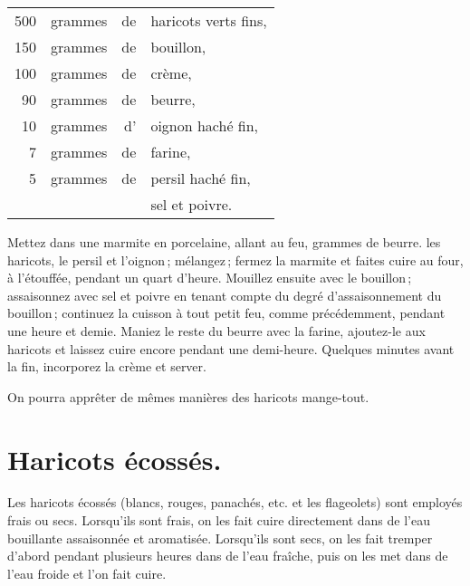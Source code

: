 \footnotesize
\begin{longtable}{rrrp{16em}}
    500 & grammes & de & haricots verts fins,                                                             \\
    150 & grammes & de & bouillon,                                                                        \\
    100 & grammes & de & crème,                                                                           \\
     90 & grammes & de & beurre,                                                                          \\
     10 & grammes & d' & oignon haché fin,                                                                \\
      7 & grammes & de & farine,                                                                          \\
      5 & grammes & de & persil haché fin,                                                                \\
        &         &    & sel et poivre.                                                                   \\
\end{longtable}
\normalsize

Mettez dans une marmite en porcelaine, allant au feu, {\mmm} grammes de
beurre. les haricots, le persil et l'oignon ; mélangez ; fermez la marmite et
faites cuire au four, à l'étouffée, pendant un quart d'heure. Mouillez ensuite
avec le bouillon ; assaisonnez avec sel et poivre en tenant compte du degré
d'assaisonnement du bouillon ; continuez la cuisson à tout petit feu, comme
précédemment, pendant une heure et demie. Maniez le reste du beurre avec la
farine, ajoutez-le aux haricots et laissez cuire encore pendant une demi-heure.
Quelques minutes avant la fin, incorporez la crème et server.

\sk

On pourra apprêter de mêmes manières des haricots mange-tout.

\section*{\centering Haricots écossés.}
{}

Les haricots écossés (blancs, rouges, panachés, etc. et les flageolets) sont
employés frais ou secs. Lorsqu'ils sont frais, on les fait cuire directement
dans de l'eau bouillante assaisonnée et aromatisée. Lorsqu'ils sont secs, on
les fait tremper d'abord pendant plusieurs heures dans de l’eau fraîche, puis
on les met dans de l'eau froide et l'on fait cuire.

